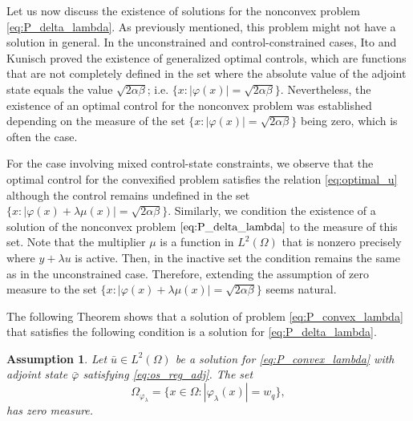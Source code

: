 \documentclass[11pt,a4paper]{amsart}
\newcommand{\om}{\Omega}
\newcounter{theassumption}
\newtheorem{assumption}[theassumption]{{Assumption}}
\begin{document}
Let us now discuss the existence of solutions for the nonconvex problem \eqref{eq:P_delta_lambda}. As previously mentioned, this problem might not have a solution in general. In the unconstrained and control-constrained cases, Ito and Kunisch \cite{itokun08} proved the existence of generalized optimal controls, which are functions that are not completely defined in the set where the absolute value of the adjoint state equals the value $\sqrt{2\alpha\beta}$; i.e. $\{x:|\varphi(x)| = \sqrt{2\alpha\beta} \}$. Nevertheless, the existence of an optimal control for the nonconvex problem was established depending on the measure of the set $\{x:|\varphi(x)| = \sqrt{2\alpha\beta} \}$ being zero, which is often the case. 

For the case involving mixed control-state constraints, we observe that the optimal control for the convexified problem satisfies the relation \eqref{eq:optimal_u} although the control remains undefined in the set $\{x:|\varphi(x) +\lambda \mu(x)| = \sqrt{2\alpha\beta} \}$. Similarly, we condition the existence of a solution of the nonconvex problem $\eqref{eq:P_delta_lambda}$ to the measure of this set. Note that the multiplier $\mu$ is a function in $L^2(\om)$ that is nonzero precisely where $y+\lambda u$ is active. Then, in the inactive set the condition remains the same as in the unconstrained case. Therefore, extending the assumption of zero measure to the set $\{x:|\varphi(x) +\lambda \mu(x)| = \sqrt{2\alpha\beta} \}$ seems natural. 


The following Theorem shows that a solution of problem \eqref{eq:P_convex_lambda} that satisfies the following condition is a solution for \eqref{eq:P_delta_lambda}.
%
\begin{assumption}\label{as:zeromeasure}
Let $\bar u \in L^2(\om)$ be a solution for \eqref{eq:P_convex_lambda} with adjoint state $\bar\varphi$ satisfying \eqref{eq:os_reg_adj}. The set
    $$\om_{\varphi_\lambda}=\{x \in \om : |\varphi_\lambda(x)|=w_q\},$$
    has zero measure.
\end{assumption}
\end{document}
